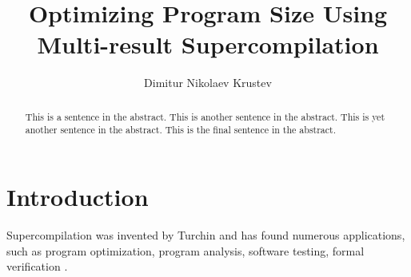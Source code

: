 \documentclass[submission,copyright,creativecommons]{eptcs}
\title{Optimizing Program Size Using Multi-result Supercompilation}
\author{Dimitur Nikolaev Krustev
\institute{IGE+XAO Balkan\\ Sofia, Bulgaria}
\email{\quad dkrustev@ige-xao.com}
}
\begin{document}
\maketitle

\begin{abstract}
This is a sentence in the abstract.
This is another sentence in the abstract.
This is yet another sentence in the abstract.
This is the final sentence in the abstract.
\end{abstract}

\section{Introduction}

Supercompilation was invented by Turchin \cite{TurchinSupercompilerConcept} and has found numerous
applications, such as program optimization\cite{Sorensen1994TurchinSupercompiler,sorm98b,TMR/SCP2014}, 
program analysis, software testing, formal verification \cite{Klyuchnikov2010,MendelGleasonPhD2011}.
\end{document}
